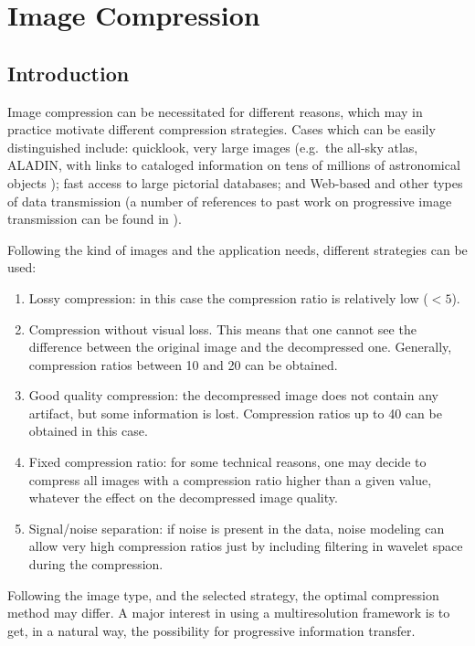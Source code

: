 \chapter{\proj Image Compression}
\label{ch_comp}

\section{Introduction}
Image compression can be necessitated for different reasons, which may 
in practice motivate different compression strategies. Cases which can be
easily distinguished include: quicklook, very large images (e.g.\ the 
all-sky atlas, ALADIN,
with links to cataloged information on tens of millions of astronomical
objects \cite{compress:bartlett96}); fast access to 
large pictorial databases; and Web-based and other types of data transmission
(a number of references to past work on progressive image transmission
can be found in \cite{compress:hannaford93}).

Following the kind of images and the application needs, different strategies 
can be used:
\begin{enumerate}
\baselineskip=0.4truecm
\item Lossy compression: in this case the compression ratio is relatively 
low ($< 5$).
\item Compression without visual loss. This means that one cannot see the 
difference between the original image and the decompressed one. Generally, 
compression ratios between 10 and 20 can be obtained.
\item Good  quality compression: the decompressed image does not contain any 
artifact, but some information is lost. Compression ratios up to 40 can be 
obtained in this case.
\item Fixed compression ratio: for some technical reasons, one may decide to 
compress all images with a compression ratio higher than a given value, 
whatever the effect on the decompressed image quality.
\item Signal/noise separation: if noise is present in the data, noise 
modeling can allow very high compression ratios just by including  
filtering in wavelet space during the compression.
\end{enumerate}
Following the image type, and the selected strategy, the optimal compression 
method may differ. A major  
interest in using a multiresolution framework is to get, in a natural way, the
possibility for progressive information transfer.

